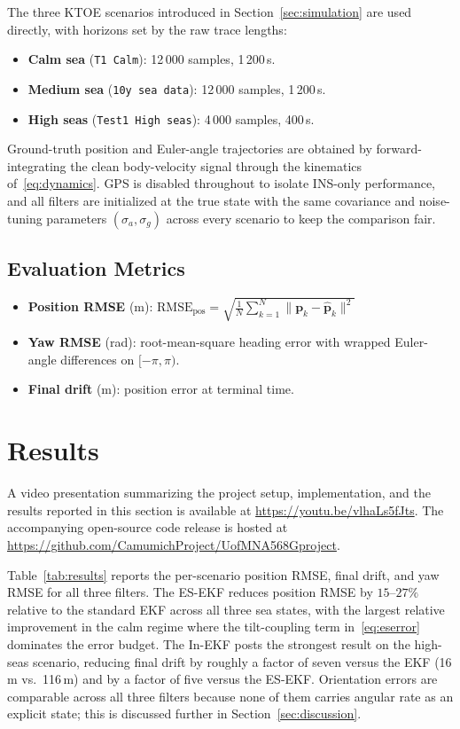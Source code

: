 \documentclass[conference]{IEEEtran}
\begin{document}
The three KTOE scenarios introduced in Section~\ref{sec:simulation} are used directly, with horizons set by the raw trace lengths:
\begin{itemize}
  \item \textbf{Calm sea} (\texttt{T1 Calm}): 12\,000 samples, 1\,200\,s.
  \item \textbf{Medium sea} (\texttt{10y sea data}): 12\,000 samples, 1\,200\,s.
  \item \textbf{High seas} (\texttt{Test1 High seas}): 4\,000 samples, 400\,s.
\end{itemize}
Ground-truth position and Euler-angle trajectories are obtained by forward-integrating the clean body-velocity signal through the kinematics of~\eqref{eq:dynamics}. GPS is disabled throughout to isolate INS-only performance, and all filters are initialized at the true state with the same covariance and noise-tuning parameters $(\sigma_a, \sigma_g)$ across every scenario to keep the comparison fair.

\subsection{Evaluation Metrics}

\begin{itemize}
  \item \textbf{Position RMSE} (m): $\text{RMSE}_{\text{pos}} = \sqrt{\frac{1}{N}\sum_{k=1}^{N}\|\mathbf{p}_k - \hat{\mathbf{p}}_k\|^2}$
  \item \textbf{Yaw RMSE} (rad): root-mean-square heading error with wrapped Euler-angle differences on $[-\pi, \pi)$.
  \item \textbf{Final drift} (m): position error at terminal time.
\end{itemize}

\section{Results}
\label{sec:results}

A video presentation summarizing the project setup, implementation, and the results reported in this section is available at \url{https://youtu.be/vlhaLs5fJts}. The accompanying open-source code release is hosted at \url{https://github.com/CamumichProject/UofMNA568Gproject}.

Table~\ref{tab:results} reports the per-scenario position RMSE, final drift, and yaw RMSE for all three filters. The ES-EKF reduces position RMSE by $15$--$27\%$ relative to the standard EKF across all three sea states, with the largest relative improvement in the calm regime where the tilt-coupling term in~\eqref{eq:eserror} dominates the error budget. The In-EKF posts the strongest result on the high-seas scenario, reducing final drift by roughly a factor of seven versus the EKF (16\,m vs.\ 116\,m) and by a factor of five versus the ES-EKF. Orientation errors are comparable across all three filters because none of them carries angular rate as an explicit state; this is discussed further in Section~\ref{sec:discussion}.
\end{document}
